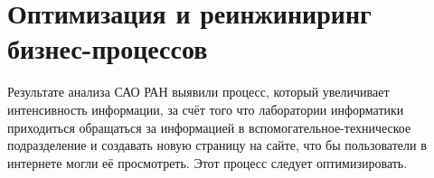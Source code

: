 \section{Оптимизация и реинжиниринг бизнес-процессов}

Результате анализа САО РАН выявили процесс, который увеличивает интенсивность информации, за счёт того что лаборатории информатики приходиться обращаться за информацией в вспомогательное-техническое подразделение и создавать новую страницу на сайте, что бы пользователи в интернете могли её просмотреть. Этот процесс следует оптимизировать. 
\pagebreak